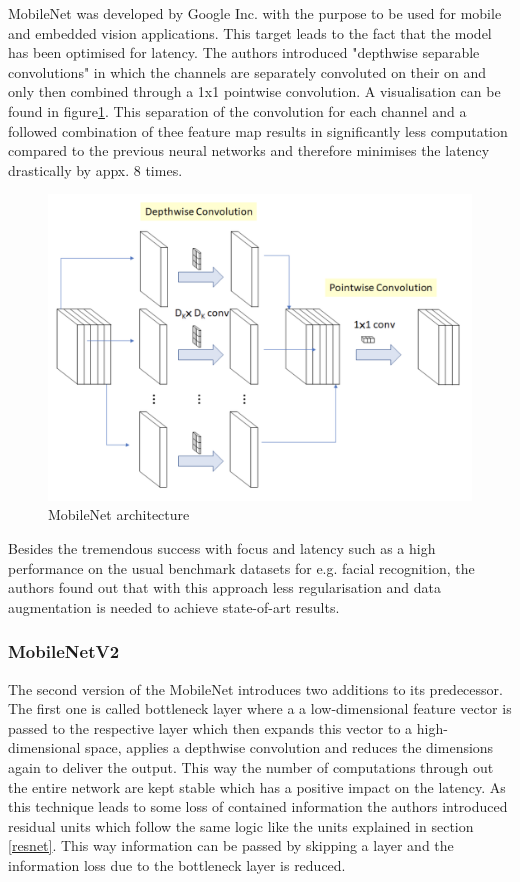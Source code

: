MobileNet was developed by Google Inc. with the purpose to be used for mobile and embedded vision applications. This target leads to the fact that the model has been optimised for latency.
The authors introduced "depthwise separable convolutions" in which the channels are separately convoluted on their on and only then combined through a 1x1 pointwise convolution\cite{howard2017mobilenets}. A visualisation can be found in figure\ref{fig:mobilenet}. This separation of the convolution for each channel and a followed combination of thee feature map results in significantly less computation compared to the previous neural networks and therefore minimises the latency drastically by appx. 8 times\cite{howard2017mobilenets}.

\begin{figure}[ht]
  \centering
  \includegraphics[width=\linewidth]{figures/mobilenet.png}
  \caption{MobileNet architecture}
  \label{fig:mobilenet}
\end{figure}

Besides the tremendous success with focus and latency such as a high performance on the usual benchmark datasets for e.g. facial recognition, the authors found out that with this approach less regularisation and data augmentation is needed to achieve state-of-art results.

\subsubsection{MobileNetV2}
The second version of the MobileNet introduces two additions to its predecessor. The first one is called bottleneck layer where a a low-dimensional feature vector is passed to the respective layer which then expands this vector to a high-dimensional space, applies a depthwise convolution and reduces the dimensions again to deliver the output\cite{sandler2019mobilenetv2}. This way the number of computations through out the entire network are kept stable which has a positive impact on the latency. As this technique leads to some loss of contained information the authors introduced residual units which follow the same logic like the units explained in section \ref{resnet}. This way information can be passed by skipping a layer and the information loss due to the bottleneck layer is reduced.

